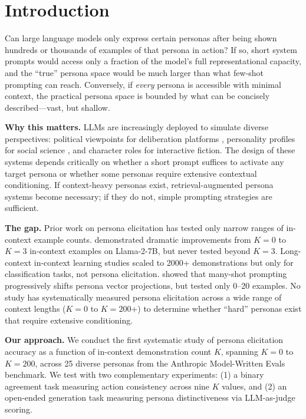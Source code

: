 \section{Introduction}
\label{sec:intro}

Can large language models only express certain personas after being shown hundreds or thousands of examples of that persona in action? If so, short system prompts would access only a fraction of the model's full representational capacity, and the ``true'' persona space would be much larger than what few-shot prompting can reach. Conversely, if \emph{every} persona is accessible with minimal context, the practical persona space is bounded by what can be concisely described---vast, but shallow.

{\bf Why this matters.}
LLMs are increasingly deployed to simulate diverse perspectives: political viewpoints for deliberation platforms \citep{tencent2024personahub}, personality profiles for social science \citep{wang2025geometry}, and character roles for interactive fiction. The design of these systems depends critically on whether a short prompt suffices to activate any target persona or whether some personas require extensive contextual conditioning. If context-heavy personas exist, retrieval-augmented persona systems become necessary; if they do not, simple prompting strategies are sufficient.

{\bf The gap.}
Prior work on persona elicitation has tested only narrow ranges of in-context example counts. \citet{choi2024picle} demonstrated dramatic improvements from $K{=}0$ to $K{=}3$ in-context examples on Llama-2-7B, but never tested beyond $K{=}3$. Long-context in-context learning studies \citep{bertsch2024longcontext} scaled to 2000+ demonstrations but only for classification tasks, not persona elicitation. \citet{chen2025personavectors} showed that many-shot prompting progressively shifts persona vector projections, but tested only 0--20 examples. No study has systematically measured persona elicitation across a wide range of context lengths ($K{=}0$ to $K{=}200$+) to determine whether ``hard'' personas exist that require extensive conditioning.

{\bf Our approach.}
We conduct the first systematic study of persona elicitation accuracy as a function of in-context demonstration count $K$, spanning $K{=}0$ to $K{=}200$, across 25 diverse personas from the Anthropic Model-Written Evals benchmark. We test \gptmini with two complementary experiments: (1) a binary agreement task measuring action consistency across nine $K$ values, and (2) an open-ended generation task measuring persona distinctiveness via LLM-as-judge scoring.

